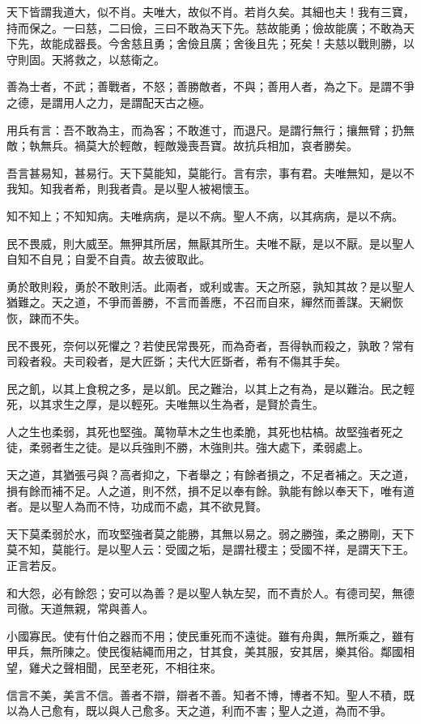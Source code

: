\begin{pinyinscope}
天下皆謂我道大，似不肖。夫唯大，故似不肖。若肖久矣。其細也夫！我有三寶，持而保之。一曰慈，二曰儉，三曰不敢為天下先。慈故能勇；儉故能廣；不敢為天下先，故能成器長。今舍慈且勇；舍儉且廣；舍後且先；死矣！夫慈以戰則勝，以守則固。天將救之，以慈衛之。

善為士者，不武；善戰者，不怒；善勝敵者，不與；善用人者，為之下。是謂不爭之德，是謂用人之力，是謂配天古之極。

用兵有言：吾不敢為主，而為客；不敢進寸，而退尺。是謂行無行；攘無臂；扔無敵；執無兵。禍莫大於輕敵，輕敵幾喪吾寶。故抗兵相加，哀者勝矣。

吾言甚易知，甚易行。天下莫能知，莫能行。言有宗，事有君。夫唯無知，是以不我知。知我者希，則我者貴。是以聖人被褐懷玉。

知不知上；不知知病。夫唯病病，是以不病。聖人不病，以其病病，是以不病。

民不畏威，則大威至。無狎其所居，無厭其所生。夫唯不厭，是以不厭。是以聖人自知不自見；自愛不自貴。故去彼取此。

勇於敢則殺，勇於不敢則活。此兩者，或利或害。天之所惡，孰知其故？是以聖人猶難之。天之道，不爭而善勝，不言而善應，不召而自來，繟然而善謀。天網恢恢，踈而不失。

民不畏死，奈何以死懼之？若使民常畏死，而為奇者，吾得執而殺之，孰敢？常有司殺者殺。夫司殺者，是大匠斲；夫代大匠斲者，希有不傷其手矣。

民之飢，以其上食稅之多，是以飢。民之難治，以其上之有為，是以難治。民之輕死，以其求生之厚，是以輕死。夫唯無以生為者，是賢於貴生。

人之生也柔弱，其死也堅強。萬物草木之生也柔脆，其死也枯槁。故堅強者死之徒，柔弱者生之徒。是以兵強則不勝，木強則共。強大處下，柔弱處上。

天之道，其猶張弓與？高者抑之，下者舉之；有餘者損之，不足者補之。天之道，損有餘而補不足。人之道，則不然，損不足以奉有餘。孰能有餘以奉天下，唯有道者。是以聖人為而不恃，功成而不處，其不欲見賢。

天下莫柔弱於水，而攻堅強者莫之能勝，其無以易之。弱之勝強，柔之勝剛，天下莫不知，莫能行。是以聖人云：受國之垢，是謂社稷主；受國不祥，是謂天下王。正言若反。

和大怨，必有餘怨；安可以為善？是以聖人執左契，而不責於人。有德司契，無德司徹。天道無親，常與善人。

小國寡民。使有什伯之器而不用；使民重死而不遠徙。雖有舟輿，無所乘之，雖有甲兵，無所陳之。使民復結繩而用之，甘其食，美其服，安其居，樂其俗。鄰國相望，雞犬之聲相聞，民至老死，不相往來。

信言不美，美言不信。善者不辯，辯者不善。知者不博，博者不知。聖人不積，既以為人己愈有，既以與人己愈多。天之道，利而不害；聖人之道，為而不爭。
\end{pinyinscope}
